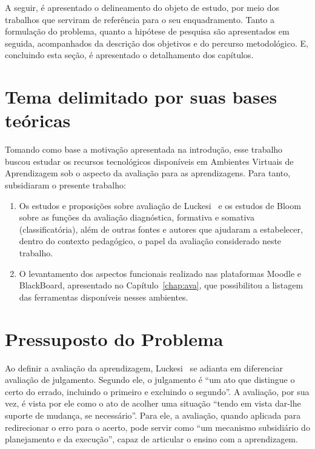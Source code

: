 A seguir, é apresentado o delineamento do objeto de estudo, por meio dos trabalhos que serviram de referência para o seu enquadramento. Tanto a formulação do problema, quanto a hipótese de pesquisa são apresentados em seguida, acompanhados da descrição dos objetivos e do percurso metodológico. E, concluindo esta seção, é apresentado o detalhamento dos capítulos.

\section{Tema delimitado por suas bases teóricas}%

    Tomando como base a motivação apresentada na introdução, esse trabalho buscou estudar os recursos tecnológicos disponíveis em Ambientes Virtuais de Aprendizagem sob o aspecto da avaliação para as aprendizagens. Para tanto, subsidiaram o presente trabalho:

\begin{enumerate}
	\item Os estudos e proposições sobre avaliação de Luckesi~\cite{luckesi2014avaliaccao} e os estudos de Bloom~\cite{bloom1983manual} sobre as funções da avaliação diagnóstica, formativa e somativa (classificatória), além de outras fontes e autores que ajudaram a estabelecer, dentro do contexto pedagógico, o papel da avaliação considerado neste trabalho.
	\item O levantamento dos aspectos funcionais realizado nas plataformas Moodle e BlackBoard, apresentado no Capítulo~\ref{chap:ava}, que possibilitou a listagem das ferramentas disponíveis nesses ambientes.
\end{enumerate}%
 
\bigskip

\section{Pressuposto do Problema}%

Ao definir a avaliação da aprendizagem, Luckesi~\cite{luckesi2014avaliaccao} se adianta em diferenciar avaliação de julgamento. Segundo ele, o julgamento é ``um ato que distingue o certo do errado, incluindo o primeiro e excluindo o segundo''. A avaliação, por sua vez, é vista por ele como o ato de acolher uma situação ``tendo em vista dar-lhe suporte de mudança, se necessário''. Para ele, a avaliação, quando aplicada para redirecionar o erro para o acerto, pode servir como ``um mecanismo subsidiário do planejamento e da execução'', capaz de articular o ensino com a aprendizagem.

